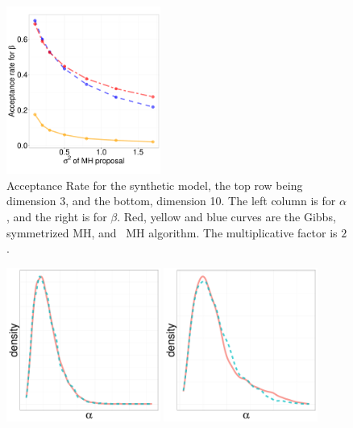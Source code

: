 {\begin{figure}[H]
\begin{minipage}[!hp]{0.99\linewidth}
\begin{minipage}[!hp]{0.99\linewidth}
    \includegraphics [width=0.45\textwidth, angle=0]{figs/acc/EXP_D10beta_k2.pdf}
  \end{minipage}
  \end{minipage}
    \caption{Acceptance Rate for the synthetic  model, the top row being dimension 3, and the bottom,
      dimension 10. The left column is for $\alpha$, and the 
    right is for $\beta$. Red, yellow and blue curves are the Gibbs, symmetrized MH,
 and \naive\ MH  algorithm. The multiplicative factor is $2$. }
     \label{fig:ACC_EXP}
  \end{figure}

  \begin{figure}[H]
  \centering
  \begin{minipage}[!hp]{0.99\linewidth}
  \centering
  \begin{minipage}[!hp]{0.99\linewidth}
    \includegraphics [width=0.45\textwidth, angle=0]{figs/EXP_ks/exp_hist_7_05_3_.pdf}
    \includegraphics [width=0.45\textwidth, angle=0]{figs/EXP_ks/exp_hist_44_05_10_.pdf}
  \end{minipage}


\end{minipage}
\end{figure}}
